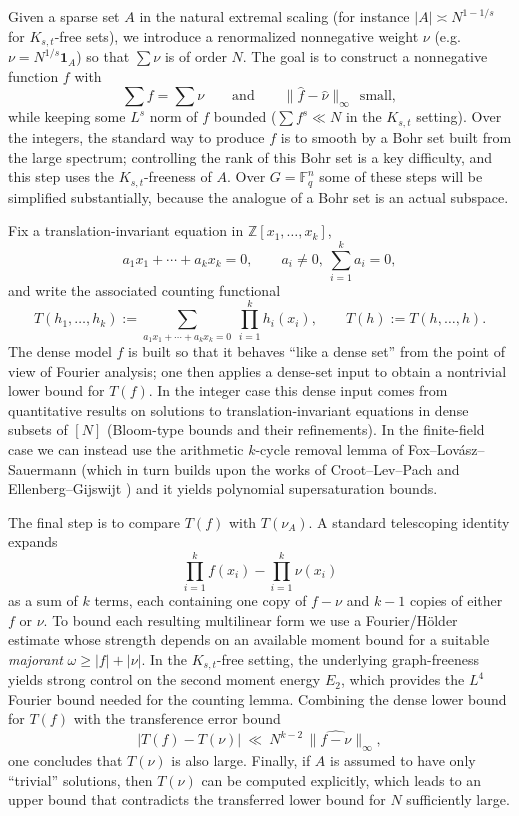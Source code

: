 \documentclass[A4paper,reqno,oneside,12pt]{amsart}
\theoremstyle{plain}
\theoremstyle{definition}
\newcommand{\F}{\mathbb{F}}
\begin{document}
\medskip
{}
Given a sparse set $A$ in the natural extremal scaling (for instance $|A|\asymp N^{1-1/s}$ for
$K_{s,t}$-free sets), we introduce a renormalized
nonnegative weight $\nu$ (e.g.\ $\nu=N^{1/s}\mathbf{1}_A$) so that
$\sum \nu$ is of order $N$.  The goal is to construct a nonnegative function $f$ with
\[
\sum f=\sum \nu
\qquad\text{and}\qquad
\|\widehat f-\widehat\nu\|_\infty \ \ \text{small},
\]
while keeping some $L^s$ norm of $f$ bounded ($\sum f^s\ll N$ in the $K_{s,t}$ setting). Over the integers, the standard way to produce $f$ is to smooth by a Bohr set built from the large
spectrum; controlling the rank of this Bohr set is a key difficulty, and this step uses the $K_{s,t}$-freeness of $A$. Over $G=\F_q^n$ some of these steps will be simplified substantially, because the analogue of a Bohr set is an actual subspace.

\medskip
{}
Fix a translation-invariant equation in $\mathbb{Z}[x_1, \dots, x_k]$, 
\[
a_1x_1+\cdots+a_kx_k=0,
\qquad a_i\ne0,\ \sum_{i=1}^k a_i=0,
\]
and write the associated counting functional
\[
T(h_1,\dots,h_k)
:=\sum_{a_1x_1+\cdots+a_kx_k=0}\ \prod_{i=1}^k h_i(x_i),
\qquad
T(h):=T(h,\dots,h).
\]
The dense model $f$ is built so that it behaves ``like a dense set'' from the point of view of
Fourier analysis; one then applies a dense-set input to obtain a nontrivial lower bound for
$T(f)$.  In the integer case this dense input comes from quantitative results on solutions to
translation-invariant equations in dense subsets of $[N]$ (Bloom-type bounds \cite{Bloom} and their refinements).
In the finite-field case we can instead use the arithmetic $k$-cycle removal lemma of
Fox--Lov\'asz--Sauermann \cite{FLS} (which in turn builds upon the works of Croot--Lev--Pach \cite{CLP17} and Ellenberg--Gijswijt \cite{EG}) and it yields polynomial supersaturation bounds.

\medskip
{}
The final step is to compare $T(f)$ with $T(\nu_A)$.  A standard telescoping identity expands
\[
\prod_{i=1}^k f(x_i)-\prod_{i=1}^k \nu(x_i)
\]
as a sum of $k$ terms, each containing one copy of $f-\nu$ and $k-1$ copies of either $f$ or $\nu$.
To bound each resulting multilinear form we use a Fourier/H\"older estimate whose strength depends
on an available moment bound for a suitable \emph{majorant} $\omega\ge |f|+|\nu|$.
In the $K_{s,t}$-free setting, the underlying graph-freeness yields strong control on the second
moment energy $E_2$, which provides the $L^4$ Fourier bound needed for the counting lemma.
Combining the dense lower bound for $T(f)$ with the transference error bound
\[
|T(f)-T(\nu)|\ \ll\ N^{k-2}\,\|\widehat{f-\nu}\|_\infty,
\]
one concludes that $T(\nu)$ is also large.  Finally, if $A$ is assumed to have only ``trivial''
solutions, then $T(\nu)$ can be computed explicitly, which leads to an upper bound that contradicts the transferred lower bound for $N$ sufficiently large. 
\end{document}
